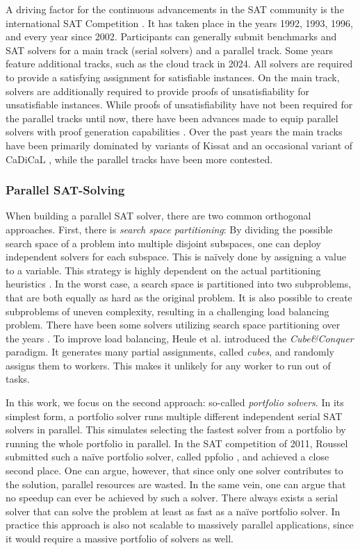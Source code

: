 \documentclass[12pt,a4paper,twoside]{scrartcl}
\numberwithin{equation}{section}
\begin{document}
A driving factor for the continuous advancements in the SAT community is the international SAT Competition \cite{satCompWebsite}. It has taken place in the years 1992, 1993, 1996, and every year since 2002. Participants can generally submit benchmarks and SAT solvers for a main track (serial solvers) and a parallel track. Some years feature additional tracks, such as the cloud track in 2024. All solvers are required to provide a satisfying assignment for satisfiable instances. On the main track, solvers are additionally required to provide proofs of unsatisfiability for unsatisfiable instances. While proofs of unsatisfiability have not been required for the parallel tracks until now, there have been advances made to equip parallel solvers with proof generation capabilities \cite{mallobProofs}.
Over the past years the main tracks have been primarily dominated by variants of Kissat \cite{kissat} and an occasional variant of CaDiCaL \cite{cadical}, while the parallel tracks have been more contested.

\subsubsection{Parallel SAT-Solving}

When building a parallel SAT solver, there are two common orthogonal approaches. First, there is \textit{search space partitioning}: By dividing the possible search space of a problem into multiple disjoint subspaces, one can deploy independent solvers for each subspace. This is na\"ively done by assigning a value to a variable. This strategy is highly dependent on the actual partitioning heuristics \cite{schulz2010cooperate}. In the worst case, a search space is partitioned into two subproblems, that are both equally as hard as the original problem. It is also possible to create subproblems of uneven complexity, resulting in a challenging load balancing problem. There have been some solvers utilizing search space partitioning over the years \cite{jurkowiak2001parallelizing, blochinger2003parallel, feldman2005parallel}. To improve load balancing, Heule et al. \cite{heule2011cube} introduced the \textit{Cube\&Conquer} paradigm. It generates many partial assignments, called \textit{cubes}, and randomly assigns them to workers. This makes it unlikely for any worker to run out of tasks.

In this work, we focus on the second approach: so-called \textit{portfolio solvers}. In its simplest form, a portfolio solver runs multiple different independent serial SAT solvers in parallel. This simulates selecting the fastest solver from a portfolio by running the whole portfolio in parallel. In the SAT competition of 2011, Roussel submitted such a na\"ive portfolio solver, called ppfolio \cite{ppfolio}, and achieved a close second place. One can argue, however, that since only one solver contributes to the solution, parallel resources are wasted. In the same vein, one can argue that no speedup can ever be achieved by such a solver.  There always exists a serial solver that can solve the problem at least as fast as a na\"ive portfolio solver. In practice this approach is also not scalable to massively parallel applications, since it would require a massive portfolio of solvers as well.
\end{document}
